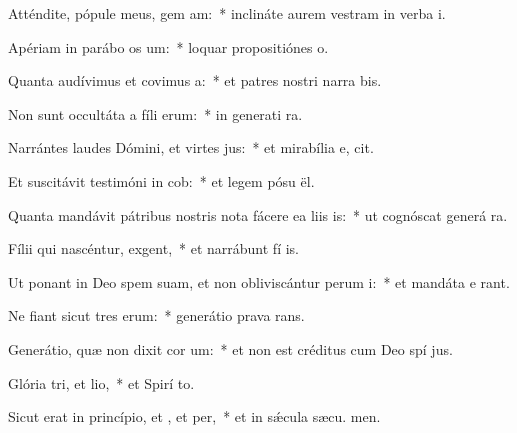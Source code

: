 \item Atténdite, pópule meus, gem am:~* inclináte aurem vestram in verba  i.
\item Apériam in parábo os um:~* loquar propositiónes  o.
\item Quanta audívimus et covimus a:~* et patres nostri narra bis.
\item Non sunt occultáta a fíli erum:~* in generati ra.
\item Narrántes laudes Dómini, et virtes jus:~* et mirabília e,  cit.
\item Et suscitávit testimóni in cob:~* et legem pósu  ël.
\item Quanta mandávit pátribus nostris nota fácere ea liis is:~* ut cognóscat generá ra.
\item Fílii qui nascéntur,  exgent,~* et narrábunt fí is.
\item Ut ponant in Deo spem suam, et non obliviscántur perum i:~* et mandáta e rant.
\item Ne fiant sicut tres erum:~* generátio prava  rans.
\item Generátio, quæ non dixit cor um:~* et non est créditus cum Deo spí jus.
\item Glória tri, et lio,~* et Spirí to.
\item Sicut erat in princípio, et , et per,~* et in sǽcula sæcu. men.
